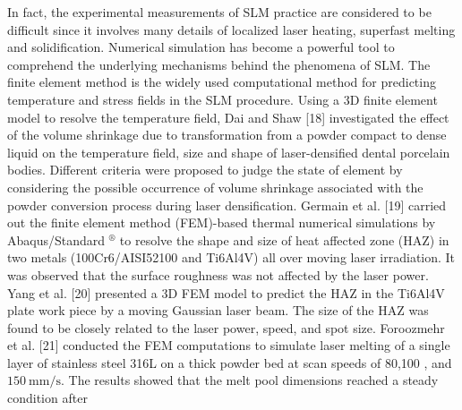 \documentclass[10pt]{article}
\begin{document}
In fact, the experimental measurements of SLM practice are considered to be difficult since it involves many details of localized laser heating, superfast melting and solidification. Numerical simulation has become a powerful tool to comprehend the underlying mechanisms behind the phenomena of SLM. The finite element method is the widely used computational method for predicting temperature and stress fields in the SLM procedure. Using a 3D finite element model to resolve the temperature field, Dai and Shaw [18] investigated the effect of the volume shrinkage due to transformation from a powder compact to dense liquid on the temperature field, size and shape of laser-densified dental porcelain bodies. Different criteria were proposed to judge the state of element by considering the possible occurrence of volume shrinkage associated with the powder conversion process during laser densification. Germain et al. [19] carried out the finite element method (FEM)-based thermal numerical simulations by Abaqus/Standard ${ }^{\circledR}$ to resolve the shape and size of heat affected zone (HAZ) in two metals (100Cr6/AISI52100 and Ti6Al4V) all over moving laser irradiation. It was observed that the surface roughness was not affected by the laser power. Yang et al. [20] presented a 3D FEM model to predict the HAZ in the Ti6Al4V plate work piece by a moving Gaussian laser beam. The size of the HAZ was found to be closely related to the laser power, speed, and spot size. Foroozmehr et al. [21] conducted the FEM computations to simulate laser melting of a single layer of stainless steel 316L on a thick powder bed at scan speeds of 80,100 , and $150 \mathrm{~mm} / \mathrm{s}$. The results showed that the melt pool dimensions reached a steady condition after\\
\end{document}
